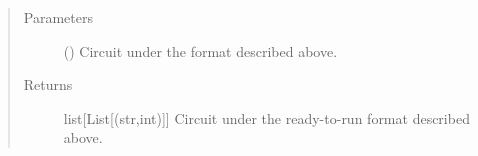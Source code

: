 \documentclass[letterpaper,10pt,english]{sphinxmanual}
\begin{document}
\begin{fulllineitems}
\begin{description}
\end{description}
\begin{quote}\begin{description}
\item[{Parameters}] \leavevmode
{} (\sphinxstyleliteralemphasis{\sphinxupquote{{[}}}\sphinxstyleliteralemphasis{\sphinxupquote{{[}}}\sphinxstyleliteralemphasis{\sphinxupquote{(}}\sphinxstyleliteralemphasis{\sphinxupquote{,}}\sphinxstyleliteralemphasis{\sphinxupquote{)}}\sphinxstyleliteralemphasis{\sphinxupquote{{]}}}\sphinxstyleliteralemphasis{\sphinxupquote{{]}}}) \textendash{} Circuit under the format described 
above.

\item[{Returns}] \leavevmode
list{[}List{[}(str,int){]}{]} \textendash{} Circuit under the ready-to-run format 
described above.

\end{description}\end{quote}

\end{fulllineitems}

\end{document}
